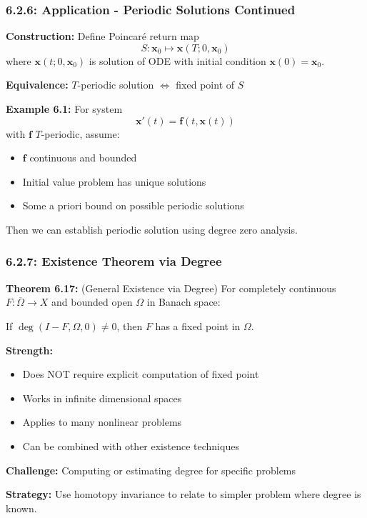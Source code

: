 \documentclass[aspectratio=169,10pt]{beamer}
\begin{document}
\begin{frame}
\frametitle{6.2.6: Application - Periodic Solutions Continued}

\textbf{Construction:} Define Poincaré return map
$$S: \mathbf{x}_0 \mapsto \mathbf{x}(T; 0, \mathbf{x}_0)$$
where $\mathbf{x}(t; 0, \mathbf{x}_0)$ is solution of ODE with initial condition $\mathbf{x}(0) = \mathbf{x}_0$.

\vspace{0.3cm}
\textbf{Equivalence:} $T$-periodic solution $\iff$ fixed point of $S$

\vspace{0.3cm}
\textbf{Example 6.1:} For system
$$\mathbf{x}'(t) = \mathbf{f}(t, \mathbf{x}(t))$$
with $\mathbf{f}$ $T$-periodic, assume:
\begin{itemize}
    \item $\mathbf{f}$ continuous and bounded
    \item Initial value problem has unique solutions
    \item Some a priori bound on possible periodic solutions
\end{itemize}

\vspace{0.2cm}
Then we can establish periodic solution using degree zero analysis.
\end{frame}

\begin{frame}
\frametitle{6.2.7: Existence Theorem via Degree}

\textbf{Theorem 6.17:} (General Existence via Degree)
For completely continuous $F: \overline{\Omega} \to X$ and bounded open $\Omega$ in Banach space:

\vspace{0.2cm}
If $\deg(I - F, \Omega, 0) \neq 0$, then $F$ has a fixed point in $\Omega$.

\vspace{0.3cm}
\textbf{Strength:}
\begin{itemize}
    \item Does NOT require explicit computation of fixed point
    \item Works in infinite dimensional spaces
    \item Applies to many nonlinear problems
    \item Can be combined with other existence techniques
\end{itemize}

\vspace{0.3cm}
\textbf{Challenge:} Computing or estimating degree for specific problems

\vspace{0.3cm}
\textbf{Strategy:} Use homotopy invariance to relate to simpler problem where degree is known.
\end{frame}
\end{document}

